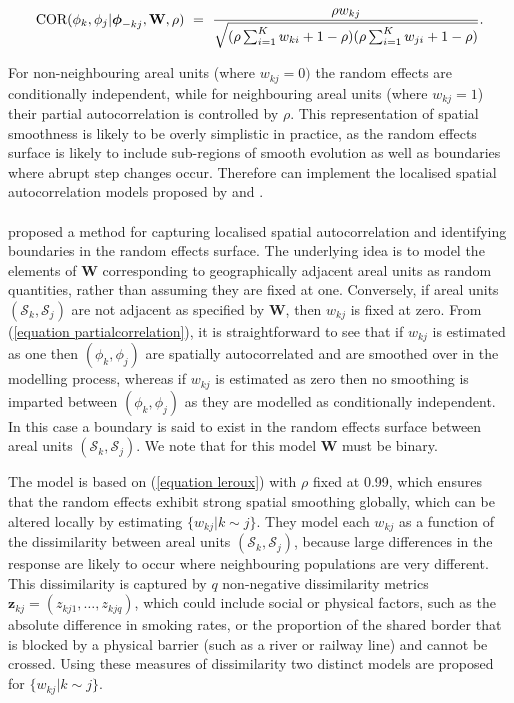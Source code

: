 \documentclass[article,shortnames,nojss]{jss}
\newcommand{\bd}[1]{\ensuremath{\mbox{\boldmath $#1$}}}
\begin{document}
\begin{equation}
\mbox{COR}(\phi_{k},\phi_{j}|\bd{\phi}_{-kj}, \mathbf{W}, \rho)~=~\frac{\rho w_{kj}}{\sqrt{(\rho\sum_{i=1}^{K}w_{ki} + 1-\rho)(\rho\sum_{i=1}^{K}w_{ji} + 1-\rho)}}\label{equation partialcorrelation}.
\end{equation}


For non-neighbouring areal units (where $w_{kj}=0)$ the random effects are conditionally independent, while for neighbouring areal units (where $w_{kj}=1$) their partial autocorrelation is controlled by $\rho$. This representation of spatial smoothness is likely to be overly simplistic in practice, as the random effects surface is likely to include sub-regions of smooth evolution as well as boundaries where abrupt step changes occur. Therefore  can implement the localised spatial autocorrelation models proposed by \cite{lee2012} and \cite{lee2015}.\\


\\ 
\cite{lee2012} proposed a method for capturing localised spatial autocorrelation and identifying boundaries in the random effects surface. The underlying idea is to model the elements of $\mathbf{W}$ corresponding to geographically adjacent areal units as random quantities, rather than assuming they are fixed at one. Conversely, if areal units $(\mathcal{S}_{k},\mathcal{S}_{j})$ are not adjacent as specified by $\mathbf{W}$, then $w_{kj}$ is fixed at zero. From (\ref{equation partialcorrelation}), it is straightforward to see that if $w_{kj}$ is estimated as one then $(\phi_k, \phi_j)$ are spatially autocorrelated and are smoothed over in the modelling process, whereas if $w_{kj}$ is estimated as zero then no smoothing is imparted between $(\phi_k, \phi_j)$ as they are modelled as conditionally independent. In this case a boundary is said to exist in the random effects surface between areal units $(\mathcal{S}_{k},\mathcal{S}_{j})$. We note that for this model $\mathbf{W}$ must be binary.

\hspace{1cm} The model is based on (\ref{equation leroux}) with $\rho$ fixed at 0.99, which ensures that the random effects exhibit strong spatial smoothing globally, which can be altered locally by estimating $\{w_{kj}|k\sim j\}$. They model each $w_{kj}$ as a function of the dissimilarity between areal units $(\mathcal{S}_{k},\mathcal{S}_{j})$, because large differences in the response are likely to occur where neighbouring populations are very different. This dissimilarity is captured by $q$ non-negative dissimilarity metrics $\mathbf{z}_{kj}=(z_{kj1},\ldots,z_{kjq})$, which could include social or physical factors, such as the absolute difference in smoking rates, or the proportion of the shared border that is blocked by a physical barrier (such as a river or railway line) and cannot be crossed. Using these measures of dissimilarity two distinct models are proposed for $\{w_{kj}|k\sim j\}$.
\end{document}
